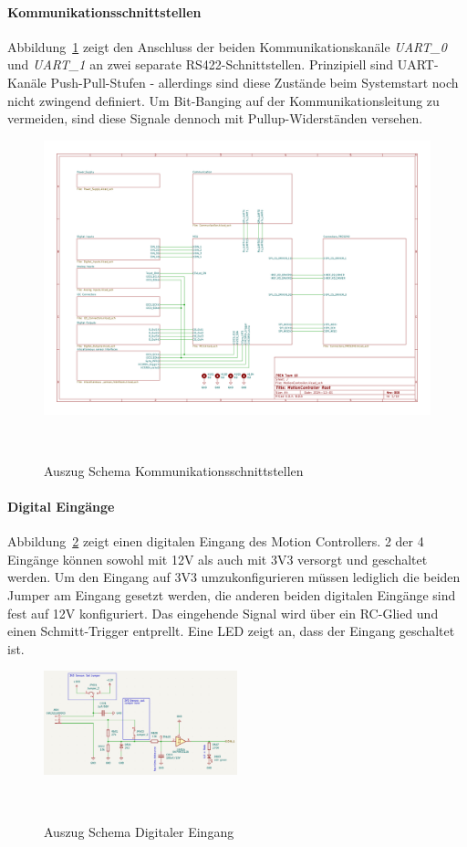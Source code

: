 \documentclass[main.  tex]{subfiles} %
\begin{document}
\paragraph{Kommunikationsschnittstellen}
Abbildung~\ref{fig:Schema_Kommunikation} zeigt den Anschluss der beiden
Kommunikationskanäle \textit{UART\_0} und \textit{UART\_1} an zwei separate
RS422-Schnittstellen. Prinzipiell sind UART-Kanäle Push-Pull-Stufen -
allerdings sind diese Zustände beim Systemstart noch nicht zwingend definiert.
Um Bit-Banging auf der Kommunikationsleitung zu vermeiden, sind diese Signale
dennoch mit Pullup-Widerständen versehen.

\begin{figure}[h!]
    \centering
    \includegraphics[page=4,width=\textwidth]{../Anhang_pdfs/MotionController.pdf}
    \caption{Auszug Schema Kommunikationsschnittstellen}~\label{fig:Schema_Kommunikation}
\end{figure}

\paragraph{Digital Eingänge}
Abbildung~\ref{fig:Schema_DInput} zeigt einen digitalen Eingang des Motion
Controllers. 2 der 4 Eingänge können sowohl mit 12V als auch mit 3V3 versorgt
und geschaltet werden. Um den Eingang auf 3V3 umzukonfigurieren müssen
lediglich die beiden Jumper am Eingang gesetzt werden, die anderen beiden
digitalen Eingänge sind fest auf 12V konfiguriert. Das eingehende Signal wird
über ein RC-Glied und einen Schmitt-Trigger entprellt. Eine LED zeigt an, dass
der Eingang geschaltet ist.

\begin{figure}[h!]
    \centering
    \includegraphics[width=0.5\textwidth]{./fig_Antriebe/Schema_DIN_Umschaltbar.png}
    \caption{Auszug Schema Digitaler Eingang}~\label{fig:Schema_DInput}
\end{figure}
\end{document}
